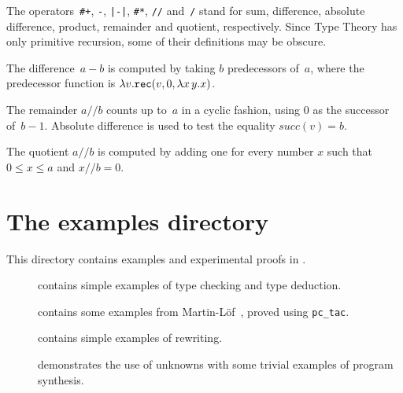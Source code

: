 The operators~\verb'#+', \verb'-', \verb'|-|', \verb'#*', \verb'//'
and~\verb'/' stand for sum, difference, absolute difference, product,
remainder and quotient, respectively.  Since Type Theory has only primitive
recursion, some of their definitions may be obscure.  

The difference~$a-b$ is computed by taking $b$ predecessors of~$a$, where
the predecessor function is $\lambda v. {\tt rec}(v, 0, \lambda x\,y.x)$.

The remainder $a//b$ counts up to~$a$ in a cyclic fashion, using 0 as the
successor of~$b-1$.  Absolute difference is used to test the equality
$succ(v)=b$.

The quotient $a//b$ is computed by adding one for every number $x$ such
that $0\leq x \leq a$ and $x//b = 0$.



\section{The examples directory}
This directory contains examples and experimental proofs in {\CTT}.
\begin{description}
\item[]
contains simple examples of type checking and type deduction.

\item[]
contains some examples from Martin-L\"of~\cite{martinlof84}, proved using 
{\tt pc_tac}.

\item[]
contains simple examples of rewriting.

\item[]
demonstrates the use of unknowns with some trivial examples of program
synthesis. 
\end{description}


